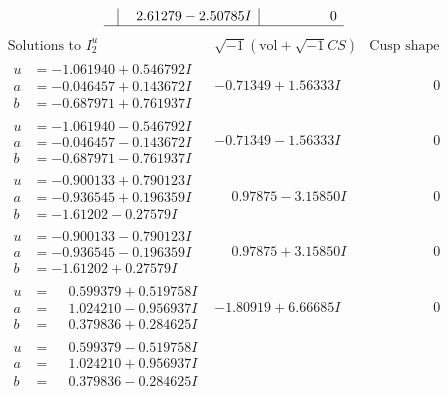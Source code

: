 \documentclass[1p]{elsarticle_modified}
\theoremstyle{definition}
\newcommand{\I}{\sqrt{-1}}
\begin{document}
$$\begin{array}{c|c|c}
 & \phantom{-}2.61279 - 2.50785 I & \phantom{-0.000000 } 0\\
 \hline 
 \end{array}$$\newpage$$\begin{array}{c|c|c}  
\text{Solutions to }I^u_{2}& \I (\text{vol} + \sqrt{-1}CS) & \text{Cusp shape}\\
 \hline 
\begin{aligned}
u &= -1.061940 + 0.546792 I \\
a &= -0.046457 + 0.143672 I \\
b &= -0.687971 + 0.761937 I\end{aligned}
 & -0.71349 + 1.56333 I & \phantom{-0.000000 } 0 \\ \hline\begin{aligned}
u &= -1.061940 - 0.546792 I \\
a &= -0.046457 - 0.143672 I \\
b &= -0.687971 - 0.761937 I\end{aligned}
 & -0.71349 - 1.56333 I & \phantom{-0.000000 } 0 \\ \hline\begin{aligned}
u &= -0.900133 + 0.790123 I \\
a &= -0.936545 + 0.196359 I \\
b &= -1.61202 - 0.27579 I\end{aligned}
 & \phantom{-}0.97875 - 3.15850 I & \phantom{-0.000000 } 0 \\ \hline\begin{aligned}
u &= -0.900133 - 0.790123 I \\
a &= -0.936545 - 0.196359 I \\
b &= -1.61202 + 0.27579 I\end{aligned}
 & \phantom{-}0.97875 + 3.15850 I & \phantom{-0.000000 } 0 \\ \hline\begin{aligned}
u &= \phantom{-}0.599379 + 0.519758 I \\
a &= \phantom{-}1.024210 - 0.956937 I \\
b &= \phantom{-}0.379836 + 0.284625 I\end{aligned}
 & -1.80919 + 6.66685 I & \phantom{-0.000000 } 0 \\ \hline\begin{aligned}
u &= \phantom{-}0.599379 - 0.519758 I \\
a &= \phantom{-}1.024210 + 0.956937 I \\
b &= \phantom{-}0.379836 - 0.284625 I\end{aligned}

\end{array}$$
\end{document}
